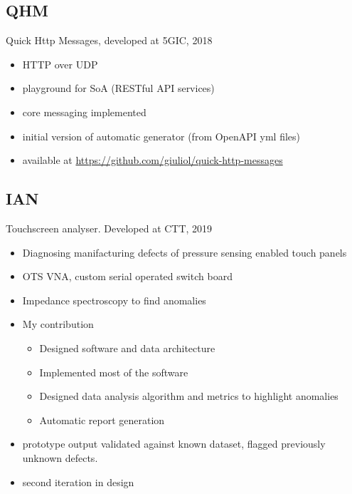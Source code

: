 \documentclass{if-beamer}
\begin{document}
\subsection{QHM}
\begin{frame}
Quick Http Messages, developed at 5GIC, 2018


\begin{itemize}
\item HTTP over UDP 
\item playground for SoA (RESTful API services)
\item core messaging implemented
\item initial version of automatic generator (from OpenAPI yml files) 
\item available at \url{https://github.com/giuliol/quick-http-messages}
\end{itemize}
\end{frame}

\subsection{IAN}
\begin{frame}

Touchscreen analyser. Developed at CTT, 2019


\begin{itemize}
\item Diagnosing manifacturing defects of pressure sensing enabled touch panels
\item OTS VNA, custom serial operated switch board
\item Impedance spectroscopy to find anomalies
\item My contribution
\begin{itemize}
\item Designed software and data architecture
\item Implemented most of the software
\item Designed data analysis algorithm and metrics to highlight anomalies
\item Automatic report generation
\end{itemize}
\item prototype output validated against known dataset, flagged previously unknown defects.
\item second iteration in design
\end{itemize}
\end{frame}
\end{document}
